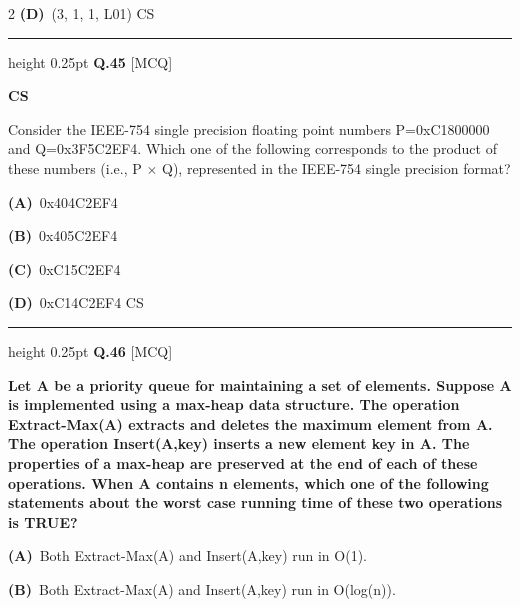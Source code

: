 \documentclass[a4paper,10pt,twoside]{article}
\begin{document}
\begin{multicols}{2}
\textbf{(D)}~(3, 1, 1, L01) \newline CS
\par\vspace{6pt}\hrule height 0.25pt\vspace{6pt}
\noindent\textbf{Q.45} \hfill {\footnotesize\textsf{[MCQ]}}
\par\vspace{2pt}
{\bfseries CS
\par\smallskip
Consider the IEEE-754 single precision ﬂoating point numbers
P=0xC1800000 and Q=0x3F5C2EF4.
Which one of the following corresponds to the product of these numbers
(i.e., P $\times$ Q), represented in the IEEE-754 single precision format? \par}
\par\vspace{2pt}\noindent
\textbf{(A)}~0x404C2EF4\par\vspace{2pt}\noindent
\textbf{(B)}~0x405C2EF4\par\vspace{2pt}\noindent
\textbf{(C)}~0xC15C2EF4\par\vspace{2pt}\noindent
\textbf{(D)}~0xC14C2EF4 \newline CS
\par\vspace{6pt}\hrule height 0.25pt\vspace{6pt}
\noindent\textbf{Q.46} \hfill {\footnotesize\textsf{[MCQ]}}
\par\vspace{2pt}
{\bfseries Let A be a priority queue for maintaining a set of elements.
Suppose A is
implemented using a max-heap data structure. The operation Extract-Max(A)
extracts and deletes the maximum element from A. The operation Insert(A,key)
inserts a new element key in A. The properties of a max-heap are preserved at the
end of each of these operations.
When A contains n elements, which one of the following statements about the worst
case running time of these two operations is TRUE? \par}
\par\vspace{2pt}\noindent
\textbf{(A)}~Both Extract-Max(A) and Insert(A,key) run in O(1).\par\vspace{2pt}\noindent
\textbf{(B)}~Both Extract-Max(A) and Insert(A,key) run in O(log(n)).\par\vspace{2pt}\noindent

\end{multicols}
\end{document}
